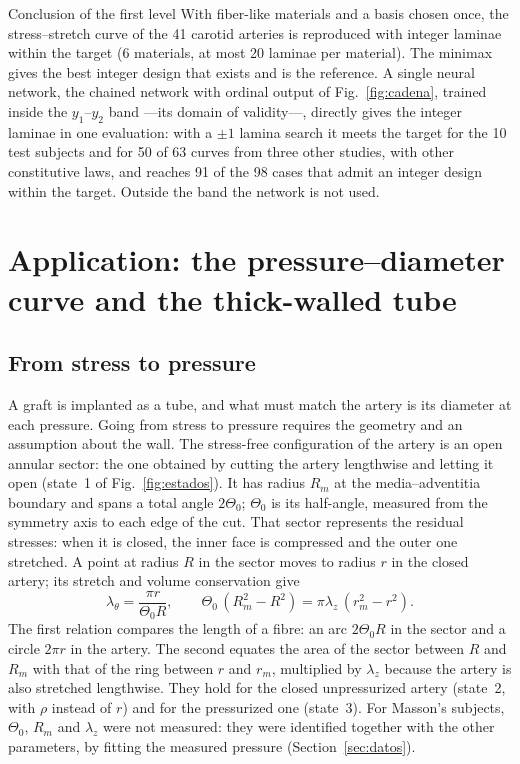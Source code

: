 \begin{summarybox}{Conclusion of the first level}
With fiber-like materials and a basis chosen once, the stress--stretch curve of the 41 carotid arteries is reproduced with integer laminae within the target (6 materials, at most 20 laminae per material). The minimax gives the best integer design that exists and is the reference. A single neural network, the chained network with ordinal output of Fig.~\ref{fig:cadena}, trained inside the $y_1$--$y_2$ band ---its domain of validity---, directly gives the integer laminae in one evaluation: with a $\pm1$ lamina search it meets the target for the 10 test subjects and for 50 of 63 curves from three other studies, with other constitutive laws, and reaches 91 of the 98 cases that admit an integer design within the target. Outside the band the network is not used.
\end{summarybox}

\section{Application: the pressure--diameter curve and the thick-walled tube}\label{sec:aplicacion}
\subsection{From stress to pressure}
A graft is implanted as a tube, and what must match the artery is its diameter at each pressure. Going from stress to pressure requires the geometry and an assumption about the wall. The stress-free configuration of the artery is an open annular sector: the one obtained by cutting the artery lengthwise and letting it open (state~1 of Fig.~\ref{fig:estados}). It has radius $R_m$ at the media--adventitia boundary and spans a total angle $2\Theta_0$; $\Theta_0$ is its half-angle, measured from the symmetry axis to each edge of the cut. That sector represents the residual stresses: when it is closed, the inner face is compressed and the outer one stretched. A point at radius $R$ in the sector moves to radius $r$ in the closed artery; its stretch and volume conservation give~\cite{masson}
\begin{equation}\label{eq:cinem}
\lambda_\theta=\frac{\pi r}{\Theta_0R},\qquad \Theta_0\,(R_m^2-R^2)=\pi\lambda_z\,(r_m^2-r^2).
\end{equation}
The first relation compares the length of a fibre: an arc $2\Theta_0R$ in the sector and a circle $2\pi r$ in the artery. The second equates the area of the sector between $R$ and $R_m$ with that of the ring between $r$ and $r_m$, multiplied by $\lambda_z$ because the artery is also stretched lengthwise. They hold for the closed unpressurized artery (state~2, with $\rho$ instead of $r$) and for the pressurized one (state~3). For Masson's subjects, $\Theta_0$, $R_m$ and $\lambda_z$ were not measured: they were identified together with the other parameters, by fitting the measured pressure (Section~\ref{sec:datos}).

